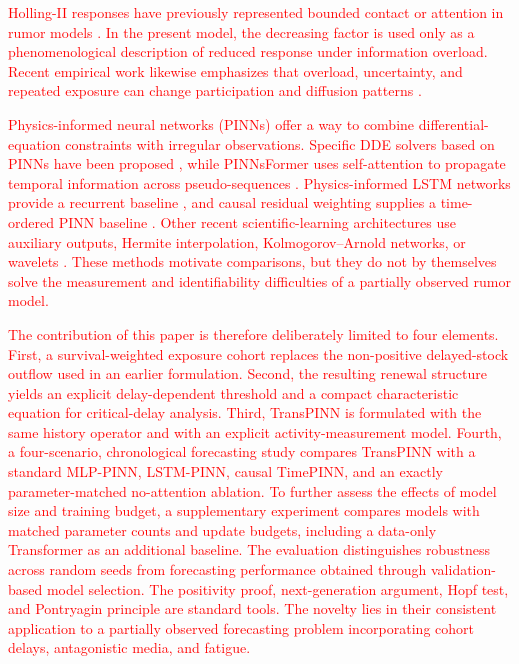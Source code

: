 \documentclass[letterpaper,journal]{IEEEtran}
\begin{document}
	\textcolor{red}{
		Holling-II responses have previously represented bounded contact or attention in rumor models \cite{huo2016holling,huo2020stochastic}. In the present model, the decreasing factor is used only as a phenomenological description of reduced response under information overload. Recent empirical work likewise emphasizes that overload, uncertainty, and repeated exposure can change participation and diffusion patterns \cite{huang2026landscape,he2026uncertainty}.	
	}

	\textcolor{red}{
	Physics-informed neural networks (PINNs) offer a way to combine differential-equation constraints with irregular observations. Specific DDE solvers based on PINNs have been proposed \cite{he2025ddepinn,yao2026ddepinn}, while PINNsFormer uses self-attention to propagate temporal information across pseudo-sequences \cite{zhao2024pinnsformer}. Physics-informed LSTM networks provide a recurrent baseline \cite{zhang2020phylstm}, and causal residual weighting supplies a time-ordered PINN baseline \cite{wang2024causalpinn}. Other recent scientific-learning architectures use auxiliary outputs, Hermite interpolation, Kolmogorov--Arnold networks, or wavelets \cite{saini2026apinn,kumar2026hermite,kumar2026kan,kumar2026wavelet}. These methods motivate comparisons, but they do not by themselves solve the measurement and identifiability difficulties of a partially observed rumor model.
	}

	\textcolor{red}{
	The contribution of this paper is therefore deliberately limited to four elements. First, a survival-weighted exposure cohort replaces the non-positive delayed-stock outflow used in an earlier formulation. Second, the resulting renewal structure yields an explicit delay-dependent threshold and a compact characteristic equation for critical-delay analysis. Third, TransPINN is formulated with the same history operator and with an explicit activity-measurement model. Fourth, a four-scenario, chronological forecasting study compares TransPINN with a standard MLP-PINN, LSTM-PINN, causal TimePINN, and an exactly parameter-matched no-attention ablation. To further assess the effects of model size and training budget, a supplementary experiment compares models with matched parameter counts and update budgets, including a data-only Transformer as an additional baseline. The evaluation distinguishes robustness across random seeds from forecasting performance obtained through validation-based model selection. The positivity proof, next-generation argument, Hopf test, and Pontryagin principle are standard tools. The novelty lies in their consistent application to a partially observed forecasting problem incorporating cohort delays, antagonistic media, and fatigue.
	}
\end{document}
